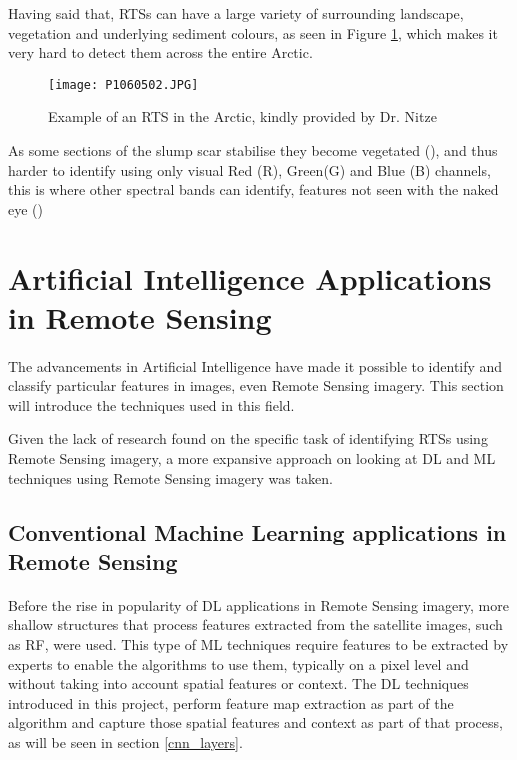 Having said that, \gls{RTS}s can have a large variety of surrounding landscape, vegetation and underlying sediment colours, as seen in Figure \ref{fig_RTS_small}, which makes it very hard to detect them across the entire Arctic.

\begin{figure}[hbt!]
    \centering
    \texttt{[image: P1060502.JPG]}
    \caption{Example of an RTS in the Arctic, kindly provided by Dr. Nitze}
    \label{fig_RTS_small}
\end{figure}

As some sections of the slump scar stabilise they become vegetated (\cite{KOKELJ201556}), and thus harder to identify using only visual Red (R), Green(G) and Blue (B) channels, this is where other spectral bands can identify, features not seen with the naked eye (\cite{HUANG2020111534})
\section{Artificial Intelligence Applications in Remote Sensing} \label{ai_rs}
\paragraph{}
The advancements in Artificial Intelligence have made it possible to identify and classify particular features in images, even Remote Sensing imagery. This section will introduce the techniques used in this field.

Given the lack of research found on the specific task of identifying \gls{RTS}s using Remote Sensing imagery, a more expansive approach on looking at \gls{DL} and \gls{ML} techniques using Remote Sensing imagery was taken.

\subsection{Conventional Machine Learning applications in Remote Sensing} \label{ml_rs}
\paragraph{}
Before the rise in popularity of \gls{DL} applications in Remote Sensing imagery, more shallow structures that process features extracted from the satellite images, such as \gls{RF}, were used. This type of \gls{ML} techniques require features to be extracted by experts to enable the algorithms to use them, typically on a pixel level and without taking into account spatial features or context. The \gls{DL} techniques introduced in this project, perform feature map extraction as part of the algorithm and capture those spatial features and context as part of that process, as will be seen in section \ref{cnn_layers}.

